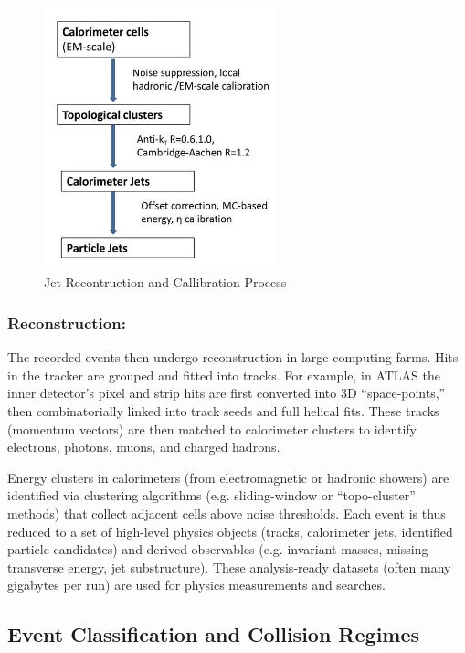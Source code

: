 \documentclass[letterpaper,12pt]{article}
\begin{document}
\begin{spacing}{1.125}
\begin{figure}[!hbt]
  \center
  \includegraphics[width=0.6\textwidth]{jet-reconstruction}
  \caption{Jet Recontruction and Callibration Process}
\end{figure}

\subsubsection{Reconstruction:}
The recorded events then undergo reconstruction in large computing farms. Hits in the tracker are grouped and fitted into tracks. For example, in ATLAS the inner detector’s pixel and strip hits are first converted into 3D “space-points,” then combinatorially linked into track seeds and full helical fits. These tracks (momentum vectors) are then matched to calorimeter clusters to identify electrons, photons, muons, and charged hadrons.

Energy clusters in calorimeters (from electromagnetic or hadronic showers) are identified via clustering algorithms (e.g. sliding-window or “topo-cluster” methods) that collect adjacent cells above noise thresholds. Each event is thus reduced to a set of high-level physics objects (tracks, calorimeter jets, identified particle candidates) and derived observables (e.g. invariant masses, missing transverse energy, jet substructure). These analysis-ready datasets (often many gigabytes per run) are used for physics measurements and searches.


\subsection{Event Classification and Collision Regimes}



\end{spacing}
\end{document}
